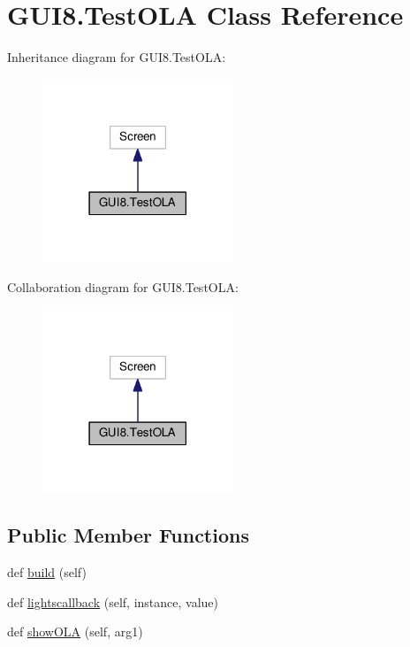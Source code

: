 \hypertarget{classGUI8_1_1TestOLA}{}\section{G\+U\+I8.\+Test\+O\+LA Class Reference}
\label{classGUI8_1_1TestOLA}


Inheritance diagram for G\+U\+I8.\+Test\+O\+LA\+:
\nopagebreak
\begin{figure}[H]
\begin{center}
\leavevmode
\includegraphics[width=162pt]{classGUI8_1_1TestOLA__inherit__graph}
\end{center}
\end{figure}


Collaboration diagram for G\+U\+I8.\+Test\+O\+LA\+:
\nopagebreak
\begin{figure}[H]
\begin{center}
\leavevmode
\includegraphics[width=162pt]{classGUI8_1_1TestOLA__coll__graph}
\end{center}
\end{figure}
\subsection*{Public Member Functions}
\begin{DoxyCompactItemize}
\item 
def \hyperlink{classGUI8_1_1TestOLA_ae6d7b035b3472fa673f762bca7c9413c}{build} (self)
\item 
def \hyperlink{classGUI8_1_1TestOLA_a9579284b91b204ce40d6542e44a0e67b}{lightscallback} (self, instance, value)
\item 
def \hyperlink{classGUI8_1_1TestOLA_a675d34e48941e6b9452b13c81ab975db}{show\+O\+LA} (self, arg1)
\end{DoxyCompactItemize}
